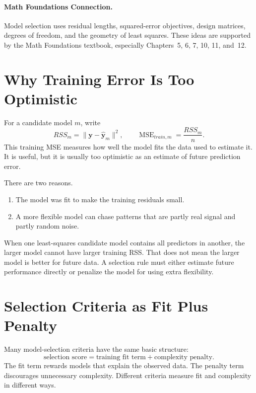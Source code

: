 \paragraph{Math Foundations Connection.}
Model selection uses residual lengths, squared-error objectives, design matrices, degrees of freedom, and the geometry of least squares.  These ideas are supported by the Math Foundations textbook, especially Chapters~5, 6, 7, 10, 11, and~12.

\section{Why Training Error Is Too Optimistic}

For a candidate model \(m\), write
\begin{equation}
  RSS_m = \|\mathbf{y}-\widehat{\mathbf{y}}_m\|^2,
  \qquad
  \operatorname{MSE}_{train,m}=\frac{RSS_m}{n}.
\end{equation}
This training MSE measures how well the model fits the data used to estimate it.  It is useful, but it is usually too optimistic as an estimate of future prediction error.

There are two reasons.
\begin{enumerate}
  \item The model was fit to make the training residuals small.
  \item A more flexible model can chase patterns that are partly real signal and partly random noise.
\end{enumerate}

When one least-squares candidate model contains all predictors in another, the larger model cannot have larger training RSS.  That does not mean the larger model is better for future data.  A selection rule must either estimate future performance directly or penalize the model for using extra flexibility.

\section{Selection Criteria as Fit Plus Penalty}

Many model-selection criteria have the same basic structure:
\begin{equation}
  \boxed{
  \text{selection score}
  =\text{training fit term}+\text{complexity penalty}.
  }
\end{equation}
The fit term rewards models that explain the observed data.  The penalty term discourages unnecessary complexity.  Different criteria measure fit and complexity in different ways.

